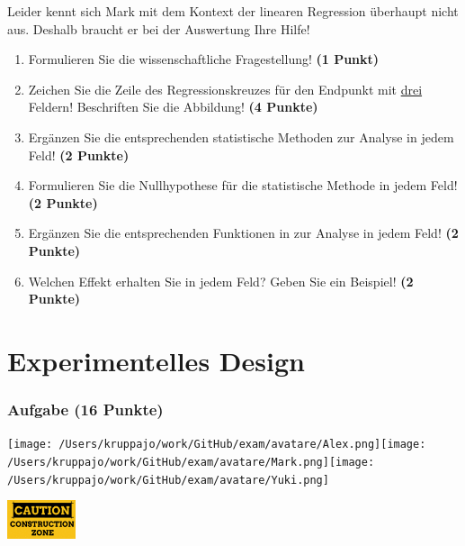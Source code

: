 \documentclass[a4paper, 9pt]{scrartcl}\usepackage[]{graphicx}\usepackage[]{xcolor}
\begin{document}
Leider kennt sich Mark mit dem Kontext der linearen Regression überhaupt nicht aus. Deshalb braucht er bei der Auswertung Ihre Hilfe!

\begin{enumerate}
  \item Formulieren Sie die wissenschaftliche Fragestellung! \textbf{(1 Punkt)}
\item Zeichen Sie die Zeile des Regressionskreuzes für den Endpunkt mit \underline{drei} Feldern! Beschriften Sie die Abbildung! \textbf{(4 Punkte)}
\item Ergänzen Sie die entsprechenden statistische Methoden zur Analyse in jedem Feld! \textbf{(2 Punkte)}
\item Formulieren Sie die Nullhypothese für die statistische Methode in jedem Feld! \textbf{(2 Punkte)}
\item Ergänzen Sie die entsprechenden Funktionen in \Rlogo zur Analyse in jedem Feld! \textbf{(2 Punkte)}
\item Welchen Effekt erhalten Sie in jedem Feld? Geben Sie ein Beispiel! \textbf{(2 Punkte)}
\end{enumerate} 
\clearpage
\part{Experimentelles Design}

\section{Aufgabe \hfill (16 Punkte)}


 
\begin{minipage}[t]{0.5\textwidth}
\texttt{[image: /Users/kruppajo/work/GitHub/exam/avatare/Alex.png]}\hspace{-4mm}\texttt{[image: /Users/kruppajo/work/GitHub/exam/avatare/Mark.png]}\hspace{-4mm}\texttt{[image: /Users/kruppajo/work/GitHub/exam/avatare/Yuki.png]}
\end{minipage}
\begin{minipage}[t]{0.5\textwidth}
\hfill
\href{https://youtu.be/wJqsNV1hOW8}{\includegraphics[width = 2cm]{img/caution}}
\end{minipage}
\end{document}
